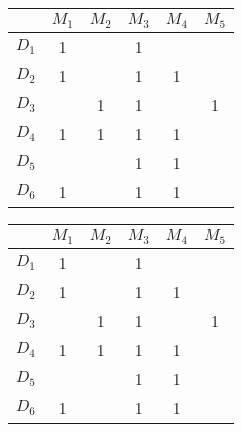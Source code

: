 \documentclass[12pt]{article}
\begin{document}
\\
\\
\begin{tabular}{|c|c|c|c|c|c|}
\hline
      & $M_1$                    & $M_2$                    & $M_3$                    & $M_4$                    & $M_5$                    \\ \hline
$D_1$ & {\color[HTML]{000000} 1} & {\color[HTML]{000000} }  & {\color[HTML]{000000} 1} & {\color[HTML]{000000} }  & {\color[HTML]{000000} }  \\ \hline
$D_2$ & {\color[HTML]{000000} 1} & {\color[HTML]{000000} }  & {\color[HTML]{000000} 1} & {\color[HTML]{000000} 1} & {\color[HTML]{000000} }  \\ \hline
$D_3$ & {\color[HTML]{000000} }  & {\color[HTML]{FE0000} 1} & {\color[HTML]{FE0000} 1} & {\color[HTML]{000000} }  & {\color[HTML]{3166FF} 1} \\ \hline
$D_4$ & {\color[HTML]{000000} 1} & {\color[HTML]{000000} 1} & {\color[HTML]{000000} 1} & {\color[HTML]{000000} 1} & {\color[HTML]{000000} }  \\ \hline
$D_5$ & {\color[HTML]{000000} }  & {\color[HTML]{000000} }  & {\color[HTML]{000000} 1} & {\color[HTML]{000000} 1} & {\color[HTML]{000000} }  \\ \hline
$D_6$ & {\color[HTML]{000000} 1} & {\color[HTML]{000000} }  & {\color[HTML]{000000} 1} & {\color[HTML]{000000} 1} & {\color[HTML]{000000} }  \\ \hline
\end{tabular}
\begin{tabular}{|c|c|c|c|c|c|}
\hline
      & $M_1$                    & $M_2$                    & $M_3$                    & $M_4$                    & $M_5$                    \\ \hline
$D_1$ & {\color[HTML]{000000} 1} & {\color[HTML]{000000} }  & {\color[HTML]{000000} 1} & {\color[HTML]{000000} }  & {\color[HTML]{000000} }  \\ \hline
$D_2$ & {\color[HTML]{000000} 1} & {\color[HTML]{000000} }  & {\color[HTML]{000000} 1} & {\color[HTML]{000000} 1} & {\color[HTML]{000000} }  \\ \hline
$D_3$ & {\color[HTML]{000000} }  & {\color[HTML]{FE0000} 1} & {\color[HTML]{FE0000} 1} & {\color[HTML]{000000} }  & {\color[HTML]{3166FF} 1} \\ \hline
$D_4$ & {\color[HTML]{FE0000} 1} & {\color[HTML]{3166FF} 1} & {\color[HTML]{FE0000} 1} & {\color[HTML]{FE0000} 1} & {\color[HTML]{000000} }  \\ \hline
$D_5$ & {\color[HTML]{000000} }  & {\color[HTML]{000000} }  & {\color[HTML]{000000} 1} & {\color[HTML]{000000} 1} & {\color[HTML]{000000} }  \\ \hline
$D_6$ & {\color[HTML]{000000} 1} & {\color[HTML]{000000} }  & {\color[HTML]{000000} 1} & {\color[HTML]{000000} 1} & {\color[HTML]{000000} }  \\ \hline
\end{tabular}
\end{document}
